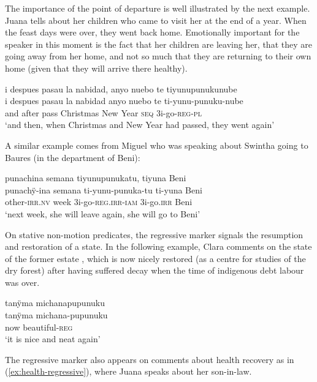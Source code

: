 The importance of the point of departure is well illustrated by the next example. Juana tells about her children who came to visit her at the end of a year. When the feast days were over, they went back home. Emotionally important for the speaker in this moment is the fact that her children are leaving her, that they are going away from her home, and not so much that they are returning to their own home (given that they will arrive there healthy).

\ea\label{ex:children-go-back}
\begingl 
\glpreamble i despues pasau la nabidad, anyo nuebo te tiyunupunukunube\\
\gla i despues pasau {la nabidad} {anyo nuebo} te ti-yunu-punuku-nube\\ 
\glb and after pass {Christmas} {New Year} \textsc{seq} 3i-go-\textsc{reg}-\textsc{pl}\\ 
\glft ‘and then, when Christmas and New Year had passed, they went again’
\trailingcitation{[jxx-p120430l-1.315]}
\xe

A similar example comes from Miguel who was speaking about Swintha going to Baures (in the department of Beni):

\ea\label{ex:Swintha-back-Baures}
\begingl
\glpreamble punachina semana tiyunupunukatu, tiyuna Beni\\
\gla punachÿ-ina semana ti-yunu-punuka-tu ti-yuna Beni\\
\glb other-\textsc{irr.nv} week 3i-go-\textsc{reg.irr}-\textsc{iam} 3i-go.\textsc{irr} Beni\\
\glft ‘next week, she will leave again, she will go to Beni’
\endgl
\trailingcitation{[mxx-d110813s-2.043-044]}
\xe


On stative non-motion predicates, the regressive marker signals the resumption and restoration of a state. In the following example, Clara comments on the state of the former estate , which is now nicely restored (as a centre for studies of the dry forest) after having suffered decay when the time of indigenous debt labour was over.

\ea\label{ex:Altavista-regresseive}
\begingl 
\glpreamble tanÿma michanapupunuku\\
\gla tanÿma michana-pupunuku\\ 
\glb now beautiful-\textsc{reg}\\ 
\glft ‘it is nice and neat again’
\trailingcitation{[cux-c120414ls-1.152]}
\xe

The regressive marker also appears on comments about health recovery as in (\ref{ex:health-regressive}), where Juana speaks about her son-in-law.

